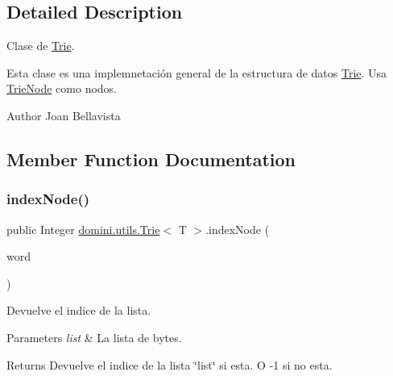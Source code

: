 \subsection{Detailed Description}
Clase de \hyperlink{classdomini_1_1utils_1_1Trie}{Trie}. 

Esta clase es una implemnetación general de la estructura de datos \hyperlink{classdomini_1_1utils_1_1Trie}{Trie}. Usa \hyperlink{classdomini_1_1utils_1_1TrieNode}{Trie\+Node} como nodos.

\begin{DoxyAuthor}{Author}
Joan Bellavista 
\end{DoxyAuthor}


\subsection{Member Function Documentation}
\mbox{\label{classdomini_1_1utils_1_1Trie_a5c30e36df9ab804bbc054805358ecf2a}} 
\subsubsection{\texorpdfstring{index\+Node()}{indexNode()}}
{\footnotesize\ttfamily public Integer \hyperlink{classdomini_1_1utils_1_1Trie}{domini.\+utils.\+Trie}$<$ T $>$.index\+Node (\begin{DoxyParamCaption}\item[{Array\+List$<$ T $>$}]{word }\end{DoxyParamCaption})\hspace{0.3cm}{\ttfamily [inline]}}



Devuelve el indice de la lista. 


\begin{DoxyParams}{Parameters}
{\em list} & La lista de bytes. \\
\hline
\end{DoxyParams}
\begin{DoxyReturn}{Returns}
Devuelve el indice de la lista \char`\"{}list\char`\"{} si esta. O -\/1 si no esta. 
\end{DoxyReturn}
\mbox{\label{classdomini_1_1utils_1_1Trie_a3599001d9b056f0b54ab7eabb9d3510b}} 
